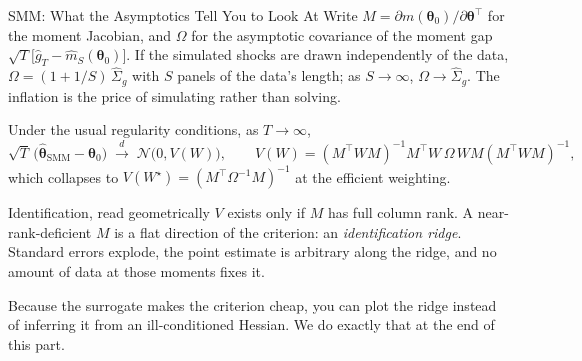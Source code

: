 \documentclass[aspectratio=169,11pt]{beamer}
\newcommand{\emphc}[1]{\textcolor{harvardcrimson}{#1}}
\newcommand{\str}{\bm{\theta}}          %
\begin{document}
\begin{frame}{SMM: What the Asymptotics Tell You to Look At}
\small
Write $M = \partial m(\str_0)/\partial\str^\top$ for the moment Jacobian, and $\Omega$ for the asymptotic covariance of the \emphc{moment gap} $\sqrt{T}\bigl[\widehat g_T - \widehat m_S(\str_0)\bigr]$. If the simulated shocks are drawn independently of the data, $\Omega = (1 + 1/S)\,\widehat\Sigma_g$ with $S$ panels of the data's length; as $S \to \infty$, $\Omega \to \widehat\Sigma_g$. \emphc{The inflation is the price of simulating rather than solving.}

\vspace{0.2em}
Under the usual regularity conditions, as $T \to \infty$,
\[
\sqrt{T}\,\bigl(\widehat{\str}_{\mathrm{SMM}} - \str_0\bigr) \;\xrightarrow{d}\; \mathcal{N}\bigl(0, V(W)\bigr),
\qquad
V(W) = (M^\top W M)^{-1} M^\top W \,\Omega\, W M (M^\top W M)^{-1},
\]
which collapses to $V(W^\star) = (M^\top \Omega^{-1} M)^{-1}$ at the efficient weighting.

\vspace{0.3em}
\begin{block}{Identification, read geometrically}
$V$ exists only if $M$ has \emphc{full column rank}. A near-rank-deficient $M$ is a \emphc{flat direction} of the criterion: an \emph{identification ridge}. Standard errors explode, the point estimate is arbitrary along the ridge, and no amount of data at those moments fixes it.

\vspace{2pt}
Because the surrogate makes the criterion cheap, you can \emphc{plot the ridge} instead of inferring it from an ill-conditioned Hessian. We do exactly that at the end of this part.
\end{block}
\end{frame}
\end{document}
